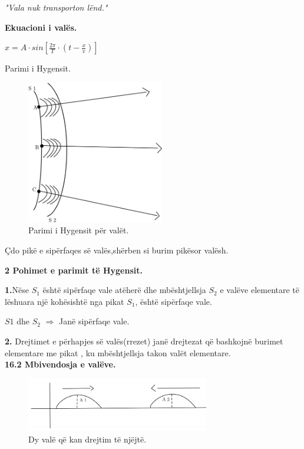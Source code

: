 \documentclass[twocolumn]{article}
\begin{document}
	\begin{center}
		\textit{"Vala nuk transporton lënd."}
	\end{center}
	
	
	\textbf{Ekuacioni i valës.}
	
	$x= A \cdot sin [\frac{2 \pi}{T} \cdot (t -\frac{x}{v})]$\\
	
	
	
	\begin{center}
		Parimi i Hygensit.
	\end{center}
	\begin{figure}[h]
		\includegraphics[width=60mm]{Imazhet/Parimi i Hygensit.png}
		\caption{Parimi i Hygensit për valët.}
		\label{fig:boat1}
	\end{figure}
	
	Çdo pikë e sipërfaqes së valës,shërben si burim
	pikësor valësh.
	
	\textbf{2 Pohimet e parimit të Hygensit.}
	
	\textbf{1.}Nëse $S_1$ është sipërfaqe vale atëherë dhe mbështjellsja $S_2$ e valëve elementare të lëshuara një kohësishtë nga pikat $S_1$, është sipërfaqe vale.
	
	
	$S1$ dhe $S_2$ $\Rightarrow$ Janë sipërfaqe vale.
	
	\textbf{2. }Drejtimet e përhapjes së valës(rrezet) janë
	drejtezat që bashkojnë burimet elementare me pikat
	, ku mbështjellsja takon valët elementare.\\
	
	
	
	\textbf{16.2 Mbivendosja e valëve.}
	
		\begin{figure}[h]
		\includegraphics[width=80mm]{Imazhet/mbivendosja1.png}
		\caption{ Dy valë që kan drejtim të njëjtë.}
		\label{fig:boat1}
	\end{figure}
\end{document}
